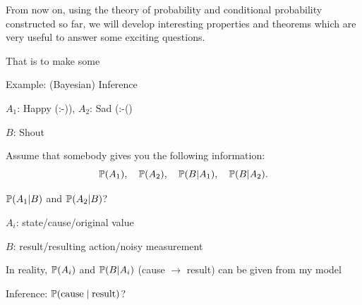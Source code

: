 \documentclass[fleqn,aspectratio=169]{beamer}
\begin{document}
\begin{frame}{}
\vspace{2cm}
\LARGE From now on, using the theory of probability and conditional probability constructed so far, we will develop interesting properties and theorems which are very useful to answer some exciting questions. 

\medskip

\LARGE That is  to make some 

\end{frame}

\begin{frame}{Example: (Bayesian) Inference}

{
\plitemsep 0.1in
\bci 

\item<2-> $A_1$: Happy (:-)), $A_2$: Sad (:-()
\item<2-> $B$: Shout

\item<4-> Assume that somebody gives you the following information:
$$
\mathbb{P}( A_1 ), \quad \mathbb{P}( A_2 ), \quad \mathbb{P}( B | A_1 ), \quad\mathbb{P}( B | A_2 ).
$$

\item<6->  $\mathbb{P}( A_1 | B )$ and $\mathbb{P}( A_2 | B )$?
\eci 
}
{
\plitemsep 0.1in
\bci 

\item<3-> $A_i$: state/cause/original value
\item<3-> $B$: result/resulting action/noisy measurement

\item<5-> In reality, $\mathbb{P}( A_i )$ and $\mathbb{P}( B | A_i )$ (cause $\rightarrow$ result) can be given from my model

\item<7-> Inference: $\mathbb{P}( \text{cause} \mid \text{result} )$?

\eci 
}

\medskip


\end{frame}
\end{document}
